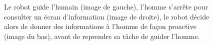 \documentclass[a4paper,11pt,twoside]{StyleThese}
\begin{document}
 \begin{figure}[ht!]
  \begin{center}
 \end{center}
  \caption{Le robot guide l'humain (image de gauche), l'homme s'arrête pour consulter un écran d'information (image de droite), le robot décide alors de donner des informations à l'homme de façon proactive (image du bas), avant de reprendre sa tâche de guider l'homme.}
  \label{fig:screen}
\end{figure}

 

\end{document}
